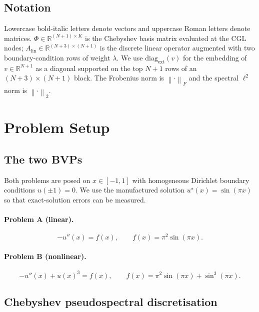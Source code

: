 \documentclass[11pt,a4paper]{article}
\newcommand{\R}{\mathbb{R}}
\newcommand{\norm}[1]{\left\lVert #1 \right\rVert}
\newcommand{\diagext}{\operatorname{diag_{ext}}}
\newcommand{\Alin}{A_{\mathrm{lin}}}
\begin{document}
\subsection{Notation}

Lowercase bold-italic letters denote vectors and uppercase Roman letters denote
matrices. $\Phi\in\R^{(N+1)\times K}$ is the Chebyshev basis matrix evaluated at
the CGL nodes; $\Alin\in\R^{(N+3)\times(N+1)}$ is the discrete linear operator
augmented with two boundary-condition rows of weight $\lambda$. We use
$\diagext(v)$ for the embedding of $v\in\R^{N+1}$ as a diagonal supported on
the top $N+1$ rows of an $(N+3)\times(N+1)$ block. The Frobenius norm is
$\norm{\cdot}_{F}$ and the spectral $\ell^{2}$ norm is $\norm{\cdot}_{2}$.

\section{Problem Setup}
\label{sec:problem}

\subsection{The two BVPs}

Both problems are posed on $x\in[-1,1]$ with homogeneous Dirichlet boundary
conditions $u(\pm 1) = 0$. We use the manufactured solution
$u^{\star}(x) = \sin(\pi x)$ so that exact-solution errors can be measured.

\paragraph{Problem A (linear).}
\begin{equation}
-u''(x) = f(x), \qquad f(x) = \pi^{2}\sin(\pi x).
\label{eq:probA}
\end{equation}

\paragraph{Problem B (nonlinear).}
\begin{equation}
-u''(x) + u(x)^{3} = f(x), \qquad f(x) = \pi^{2}\sin(\pi x) + \sin^{3}(\pi x).
\label{eq:probB}
\end{equation}

\subsection{Chebyshev pseudospectral discretisation}
\end{document}
